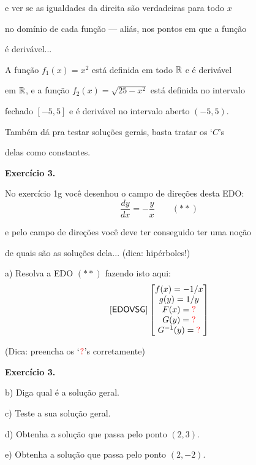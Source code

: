 \documentclass[oneside,12pt]{article}
\begin{document}
e ver se as igualdades da direita são verdadeiras para todo $x$

no domínio de cada função --- aliás, nos pontos em que a função

é derivável...

\msk

A função $f_1(x)=x^2$ está definida em todo $\mathbb{R}$ e é derivável

em $\mathbb{R}$, e a função $f_2(x) = \sqrt{25-x^2}$ está definida no intervalo

fechado $[-5,5]$ e é derivável no intervalo aberto $(-5,5)$.

\msk

Também dá pra testar soluções gerais, basta tratar os `$C$'s

delas como constantes.

\newpage


{\bf Exercício 3.}

No exercício 1g você desenhou o campo de direções desta EDO:
%
$$ \frac{dy}{dx} = - \frac{y}{x} \qquad (**)$$

e pelo campo de direções você deve ter conseguido ter uma noção

de quais são as soluções dela... (dica: hipérboles!)

\msk

a) Resolva a EDO $(**)$ fazendo isto aqui:
%
$$\pfo{EDOVSG}
  \bmat{f(x) = -1/x \\
        g(y) = 1/y \\
        F(x) = \Rd{?} \\
        G(y) = \Rd{?} \\
        G^{-1}(y) = \Rd{?} \\
        }
$$

(Dica: preencha os `$\Rd{?}$'s corretamente)

\newpage

{\bf Exercício 3.}

b) Diga qual é a solução geral.

c) Teste a sua solução geral.

d) Obtenha a solução que passa pelo ponto $(2,3)$.

e) Obtenha a solução que passa pelo ponto $(2,-2)$.



\newpage

\end{document}
